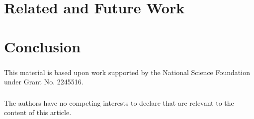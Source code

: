 \documentclass[runningheads]{llncs}
\begin{document}
\section{Related and Future Work}

\section{Conclusion}

\begin{credits}
\subsubsection{\ackname}
% 
This material is based upon work supported by the National Science Foundation
under Grant No. 2245516.

\subsubsection{\discintname}
%
The authors have no competing interests to declare that are
relevant to the content of this article.
\end{credits}
%
%
%


\end{document}
